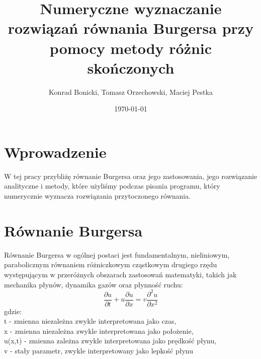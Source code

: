 \documentclass[a4paper,12pt]{article}
\title{Numeryczne wyznaczanie rozwiązań równania Burgersa przy pomocy metody różnic skończonych}
\author{Konrad Bonicki, Tomasz Orzechowski, Maciej Pestka}
\date{\today}
\begin{document}
\maketitle



\section{Wprowadzenie}
W tej pracy przybliżę równanie Burgersa oraz jego zastosowania, jego rozwiązanie analityczne i metody, które użyliśmy podczas pisania programu, który numerycznie wyznacza rozwiązania przytoczonego równania.

\section{Równanie Burgersa}
Równanie Burgersa w ogólnej postaci jest fundamentalnym, nieliniowym, parabolicznym równaniem różniczkowym cząstkowym drugiego rzędu występującym w przeróżnych obszarach zastosowań matematyki, takich jak mechanika płynów, dynamika gazów oraz płynność ruchu:
     \begin{equation}
\frac{\partial u}{\partial t} + u \frac{\partial u}{\partial x} = v \frac{\partial ^2 u}{\partial x^2}
\end{equation}
gdzie: \\ t - zmienna niezależna zwykle interpretowana jako czas, \\ x - zmienna niezależna zwykle interpretowana jako położenie, \\ u(x,t) - zmienna zależna zwykle interpretowana jako prędkość płynu, \\ v - stały parametr, zwykle interpretowany jako lepkość płynu
\end{document}
